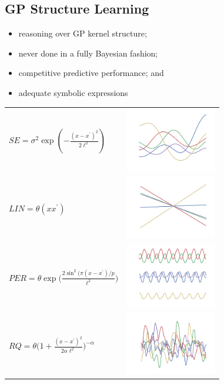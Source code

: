 \documentclass[a0,portrait]{a0poster}
\begin{document}
\begin{multicols}{3}
\section*{GP Structure Learning}
\begin{itemize}
\setlength{\itemindent}{1cm}
 \item reasoning over GP kernel structure;
 \item never done in a fully Bayesian fashion;
 \item competitive predictive performance; and
 \item adequate symbolic expressions
 \end{itemize}
 \begin{center} 
\begin{tabular}{m{11.5cm} m{4cm}}
$SE = \sigma^2 \exp(-\frac{(x-x^\prime)^2}{2\ell^2})$&\includegraphics[width=4cm]{gpSamples/se.png}\\
$LIN = \theta (x x^\prime)$&\includegraphics[width=4cm]{gpSamples/lin.png}\\
$PER = \theta \exp \bigg( \frac{2 \sin^2 ( \pi (x - x^\prime)/p}{\ell^2} \bigg)$&\includegraphics[width=4cm]{gpSamples/per.png}\\
$RQ =   \theta \bigg(1 + \frac{(x - x^\prime)^2}{2 \alpha \ell^2} \bigg)^{-\alpha}$&\includegraphics[width=4cm]{gpSamples/rq.png}
\end{tabular}
\end{center}

\end{multicols}
\end{document}
